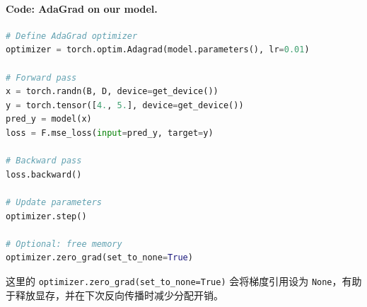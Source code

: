 \paragraph{Code: AdaGrad on our model.}
\begin{lstlisting}[language=Python]
# Define AdaGrad optimizer
optimizer = torch.optim.Adagrad(model.parameters(), lr=0.01)

# Forward pass
x = torch.randn(B, D, device=get_device())
y = torch.tensor([4., 5.], device=get_device())
pred_y = model(x)
loss = F.mse_loss(input=pred_y, target=y)

# Backward pass
loss.backward()

# Update parameters
optimizer.step()

# Optional: free memory
optimizer.zero_grad(set_to_none=True)
\end{lstlisting}

\noindent
这里的 \texttt{optimizer.zero\_grad(set\_to\_none=True)} 会将梯度引用设为 \texttt{None}，有助于释放显存，并在下次反向传播时减少分配开销。

